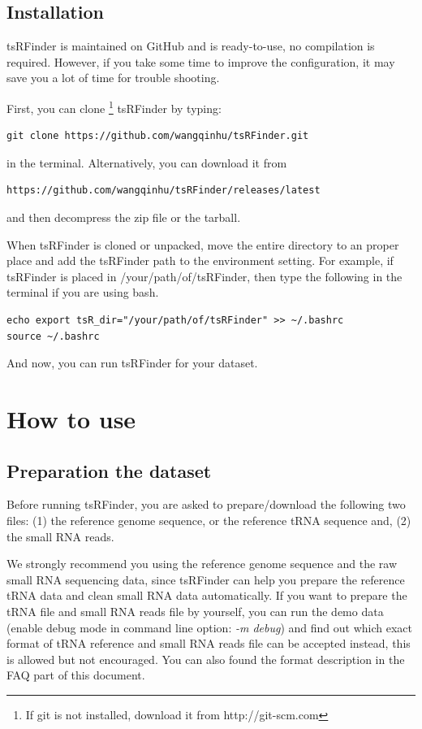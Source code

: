 \documentclass[11pt, a4paper]{article}
\begin{document}
\subsection{Installation}

tsRFinder is maintained on GitHub and is ready-to-use, no compilation is required. However, if you take some time to improve the configuration, it may save you a lot of time for trouble shooting.

First, you can clone \footnote{If git is not installed, download it from http://git-scm.com} tsRFinder by typing:

{\small \begin{verbatim}
git clone https://github.com/wangqinhu/tsRFinder.git
\end{verbatim}}

in the terminal. Alternatively, you can download it from

{\small \begin{verbatim}
https://github.com/wangqinhu/tsRFinder/releases/latest
\end{verbatim}
}

and then decompress the zip file or the tarball.

When tsRFinder is cloned or unpacked, move the entire directory to an proper place and add the tsRFinder path to the environment setting. For example, if tsRFinder is placed in /your/path/of/tsRFinder, then type the following in the terminal if you are using bash.

{\small \begin{verbatim}
echo export tsR_dir="/your/path/of/tsRFinder" >> ~/.bashrc
source ~/.bashrc
\end{verbatim}}

And now, you can run tsRFinder for your dataset.

\section{How to use}

\subsection{Preparation the dataset}

Before running tsRFinder, you are asked to prepare/download the following two files: (1) the reference genome sequence, or the reference tRNA sequence and, (2) the small RNA reads.

We strongly recommend you using the reference genome sequence and the raw small RNA sequencing data, since tsRFinder can help you prepare the reference tRNA data and clean small RNA data automatically. If you want to prepare the tRNA file and small RNA reads file by yourself, you can run the demo data (enable debug mode in command line option: \emph{-m debug}) and find out which exact format of tRNA reference and small RNA reads file can be accepted instead, this is allowed but not encouraged. You can also found the format description in the FAQ part of this document.
\end{document}
